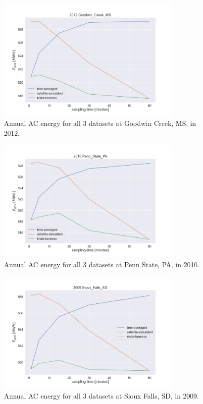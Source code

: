 \documentclass[conference]{IEEEtran}
\begin{document}
\begin{figure}[htbp]
\centerline{\includegraphics[width=9cm]{analysis/gwn2012.png}}
\caption{Annual AC energy for all 3 datasets at Goodwin Creek, MS, in 2012.}
\label{fig:gwn2012}
\end{figure}

\begin{figure}[htbp]
\centerline{\includegraphics[width=9cm]{analysis/psu2010.png}}
\caption{Annual AC energy for all 3 datasets at Penn State, PA, in 2010.}
\label{fig:psu2010}
\end{figure}

\begin{figure}[htbp]
\centerline{\includegraphics[width=9cm]{analysis/sxf2009.png}}
\caption{Annual AC energy for all 3 datasets at Sioux Falls, SD, in 2009.}
\label{fig:sxf2009}
\end{figure}
\end{document}
